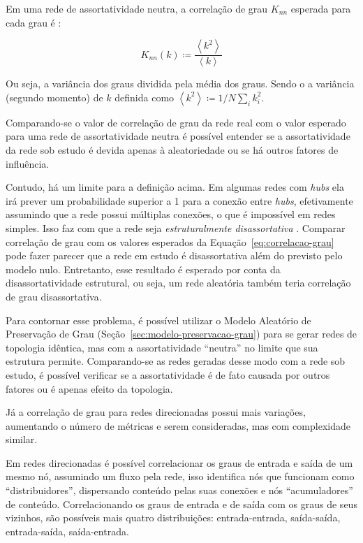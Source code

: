 \documentclass[12pt,a4paper]{article}
\theoremstyle{hypo}
\newcommand{\avg}[1]{\left\langle #1 \right\rangle} %
\newcommand{\defn}{\coloneqq} %
\begin{document}
Em uma rede de assortatividade neutra, a correlação de grau $K_\textit{nn}$ esperada para cada grau é \cite{Barabasi2016-rn}:

\begin{equation} \label{eq:correlacao-grau}
K_\textit{nn}(k) \defn \frac{\avg{k^2}}{\avg{k}}
\end{equation}

Ou seja, a variância dos graus dividida pela média dos graus. Sendo o a variância (segundo momento) de $k$ definida como $\avg{k^2} \defn 1/N \sum_i k_i^2$.

Comparando-se o valor de correlação de grau da rede real com o valor esperado para uma rede de assortatividade neutra é possível entender se a assortatividade da rede sob estudo é devida apenas à aleatoriedade ou se há outros fatores de influência.

Contudo, há um limite para a definição acima. Em algumas redes com \textit{hubs} ela irá prever um probabilidade superior a 1 para a conexão entre \textit{hubs}, efetivamente assumindo que a rede possui múltiplas conexões, o que é impossível em redes simples. Isso faz com que a rede seja \textit{estruturalmente disassortativa} \cite{Barabasi2016-rn}. Comparar correlação de grau com os valores esperados da Equação~\ref{eq:correlacao-grau} pode fazer parecer que a rede em estudo é disassortativa além do previsto pelo modelo nulo. Entretanto, esse resultado é esperado por conta da disassortatividade estrutural, ou seja, um rede aleatória também teria correlação de grau disassortativa.

Para contornar esse problema, é possível utilizar o Modelo Aleatório de Preservação de Grau (Seção~\ref{sec:modelo-preservacao-grau}) para se gerar redes de topologia idêntica, mas com a assortatividade \enquote{neutra} no limite que sua estrutura permite. Comparando-se as redes geradas desse modo com a rede sob estudo, é possível verificar se a assortatividade é de fato causada por outros fatores ou é apenas efeito da topologia.

Já a correlação de grau para redes direcionadas possui mais variações, aumentando o número de métricas e serem consideradas, mas com complexidade similar.

Em redes direcionadas é possível correlacionar os graus de entrada e saída de um mesmo nó, assumindo um fluxo pela rede, isso identifica nós que funcionam como \enquote{distribuidores}, dispersando conteúdo pelas suas conexões e nós \enquote{acumuladores} de conteúdo. Correlacionando os graus de entrada e de saída com  os graus de seus vizinhos, são possíveis mais quatro distribuições: entrada-entrada, saída-saída, entrada-saída, saída-entrada.
\end{document}
